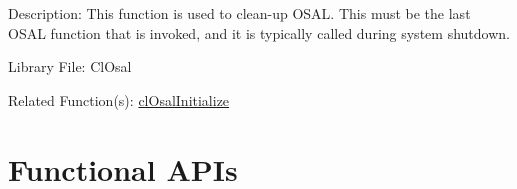\begin{Desc}
\item[Description:]This function is used to clean-up OSAL. This must be the last OSAL function that is invoked, and it is typically called during system shutdown.\end{Desc}
\begin{Desc}
\item[Library File:]Cl\-Osal\end{Desc}
\begin{Desc}
\item[Related Function(s):]\hyperlink{pageosal101}{cl\-Osal\-Initialize} \end{Desc}

\newpage

\section{Functional APIs}
